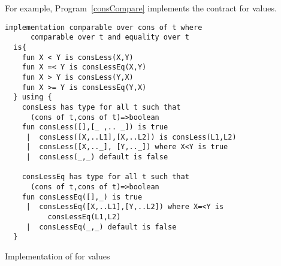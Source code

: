 For example, Program~\vref{consCompare} implements the  contract for  values.
\begin{program}
\begin{lstlisting}
implementation comparable over cons of t where
      comparable over t and equality over t
  is{
    fun X < Y is consLess(X,Y)
    fun X =< Y is consLessEq(X,Y)
    fun X > Y is consLess(Y,X)
    fun X >= Y is consLessEq(Y,X)
  } using {
    consLess has type for all t such that
      (cons of t,cons of t)=>boolean
    fun consLess([],[_ ,.. _]) is true
     |  consLess([X,..L1],[X,..L2]) is consLess(L1,L2)
     |  consLess([X,.._], [Y,.._]) where X<Y is true
     |  consLess(_,_) default is false
    
    consLessEq has type for all t such that
      (cons of t,cons of t)=>boolean
    fun consLessEq([],_) is true
     |  consLessEq([X,..L1],[Y,..L2]) where X=<Y is
          consLessEq(L1,L2)
     |  consLessEq(_,_) default is false
  }
\end{lstlisting}
\caption{Implementation of  for  values\label{consCompare}}
\end{program}


